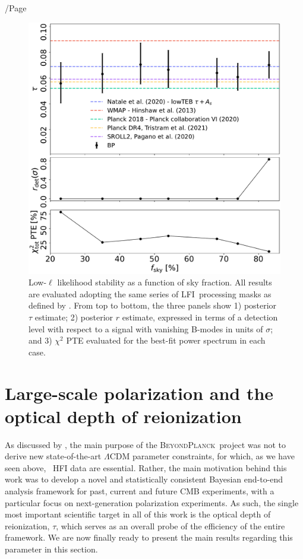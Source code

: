 /Page\documentclass[twocolumn]{aa}
\newcommand{\BP}{\textsc{BeyondPlanck}}
\newcommand{\lfi}[0]{LFI}
\begin{document}
\begin{figure}[t]
	\center
	\includegraphics[width=\linewidth]{figs/lowl_fsky_tau_r_PTE_BI200_regP05.pdf}
  	\caption{Low-$\ell$ likelihood stability as a function of sky
          fraction. All results are evaluated adopting the same series
          of \lfi\ processing masks as defined by
          \citep{planck2016-l05}. From top to bottom, the three panels
          show 1) posterior $\tau$ estimate; 2) posterior $r$
          estimate, expressed in terms of a detection level with
          respect to a signal with vanishing B-modes in units of
          $\sigma$; and 3) $\chi^2$ PTE evaluated for the best-fit
          power spectrum in each case.}
	\label{fig:lowl_fsky}
\end{figure}



\section{Large-scale polarization and the optical depth of reionization}
\label{sec:low_ell_results}

As discussed by \citet{bp01}, the main purpose of the \BP\ project was
not to derive new state-of-the-art $\Lambda$CDM parameter constraints,
for which, as we have seen above, \Planck\ HFI data are
essential. Rather, the main motivation behind this work was to
develop a novel and statistically consistent Bayesian end-to-end
analysis framework for past, current and future CMB experiments, with
a particular focus on next-generation polarization experiments. As
such, the single most important scientific target in all of this work
is the optical depth of reionization, $\tau$, which serves as an
overall probe of the efficiency of the entire framework. We are now
finally ready to present the main results regarding this parameter in
this section.
\end{document}
